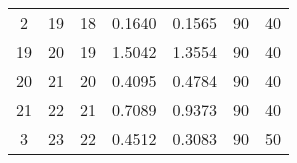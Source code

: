 \begin{table}[]
\begin{adjustbox}{width=1.1\textwidth,center=\textwidth}
\begin{tabular}{@{}ccccccc@{}}
2                                                              & 19                                                             & 18                                                   & 0.1640                                                                         & 0.1565                                                                         & 90                                                                               & 40                                                                                   \\
19                                                             & 20                                                             & 19                                                   & 1.5042                                                                         & 1.3554                                                                         & 90                                                                               & 40                                                                                   \\
20                                                             & 21                                                             & 20                                                   & 0.4095                                                                         & 0.4784                                                                         & 90                                                                               & 40                                                                                   \\
21                                                             & 22                                                             & 21                                                   & 0.7089                                                                         & 0.9373                                                                         & 90                                                                               & 40                                                                                   \\
3                                                              & 23                                                             & 22                                                   & 0.4512                                                                         & 0.3083                                                                         & 90                                                                               & 50                                                                                   \\

\end{tabular}
\end{adjustbox}
\end{table}
